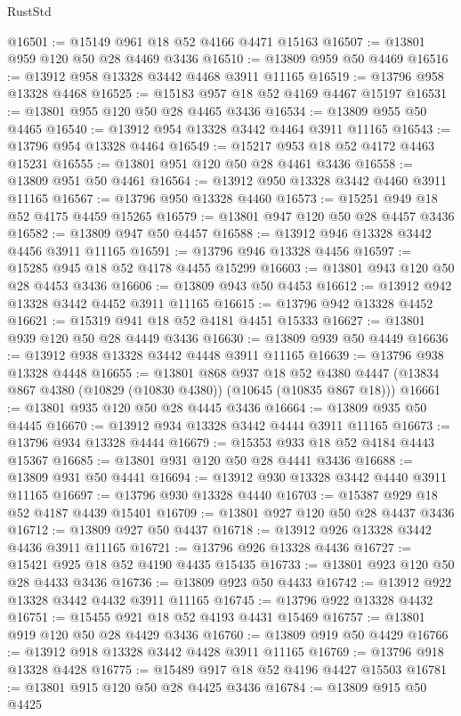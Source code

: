 \begin{lexlean}{RustStd}
\begin{coremodule}
@16501 := @15149 @961 @18 @52 @4166 @4471 @15163
@16507 := @13801 @959 @120 @50 @28 @4469 @3436
@16510 := @13809 @959 @50 @4469
@16516 := @13912 @958 @13328 @3442 @4468 @3911 @11165
@16519 := @13796 @958 @13328 @4468
@16525 := @15183 @957 @18 @52 @4169 @4467 @15197
@16531 := @13801 @955 @120 @50 @28 @4465 @3436
@16534 := @13809 @955 @50 @4465
@16540 := @13912 @954 @13328 @3442 @4464 @3911 @11165
@16543 := @13796 @954 @13328 @4464
@16549 := @15217 @953 @18 @52 @4172 @4463 @15231
@16555 := @13801 @951 @120 @50 @28 @4461 @3436
@16558 := @13809 @951 @50 @4461
@16564 := @13912 @950 @13328 @3442 @4460 @3911 @11165
@16567 := @13796 @950 @13328 @4460
@16573 := @15251 @949 @18 @52 @4175 @4459 @15265
@16579 := @13801 @947 @120 @50 @28 @4457 @3436
@16582 := @13809 @947 @50 @4457
@16588 := @13912 @946 @13328 @3442 @4456 @3911 @11165
@16591 := @13796 @946 @13328 @4456
@16597 := @15285 @945 @18 @52 @4178 @4455 @15299
@16603 := @13801 @943 @120 @50 @28 @4453 @3436
@16606 := @13809 @943 @50 @4453
@16612 := @13912 @942 @13328 @3442 @4452 @3911 @11165
@16615 := @13796 @942 @13328 @4452
@16621 := @15319 @941 @18 @52 @4181 @4451 @15333
@16627 := @13801 @939 @120 @50 @28 @4449 @3436
@16630 := @13809 @939 @50 @4449
@16636 := @13912 @938 @13328 @3442 @4448 @3911 @11165
@16639 := @13796 @938 @13328 @4448
@16655 := @13801
    @868
    @937
    @18
    @52
    @4380
    @4447
    (@13834 @867 @4380 (@10829 (@10830 @4380)) (@10645 (@10835 @867 @18)))
@16661 := @13801 @935 @120 @50 @28 @4445 @3436
@16664 := @13809 @935 @50 @4445
@16670 := @13912 @934 @13328 @3442 @4444 @3911 @11165
@16673 := @13796 @934 @13328 @4444
@16679 := @15353 @933 @18 @52 @4184 @4443 @15367
@16685 := @13801 @931 @120 @50 @28 @4441 @3436
@16688 := @13809 @931 @50 @4441
@16694 := @13912 @930 @13328 @3442 @4440 @3911 @11165
@16697 := @13796 @930 @13328 @4440
@16703 := @15387 @929 @18 @52 @4187 @4439 @15401
@16709 := @13801 @927 @120 @50 @28 @4437 @3436
@16712 := @13809 @927 @50 @4437
@16718 := @13912 @926 @13328 @3442 @4436 @3911 @11165
@16721 := @13796 @926 @13328 @4436
@16727 := @15421 @925 @18 @52 @4190 @4435 @15435
@16733 := @13801 @923 @120 @50 @28 @4433 @3436
@16736 := @13809 @923 @50 @4433
@16742 := @13912 @922 @13328 @3442 @4432 @3911 @11165
@16745 := @13796 @922 @13328 @4432
@16751 := @15455 @921 @18 @52 @4193 @4431 @15469
@16757 := @13801 @919 @120 @50 @28 @4429 @3436
@16760 := @13809 @919 @50 @4429
@16766 := @13912 @918 @13328 @3442 @4428 @3911 @11165
@16769 := @13796 @918 @13328 @4428
@16775 := @15489 @917 @18 @52 @4196 @4427 @15503
@16781 := @13801 @915 @120 @50 @28 @4425 @3436
@16784 := @13809 @915 @50 @4425

\end{coremodule}
\end{lexlean}

